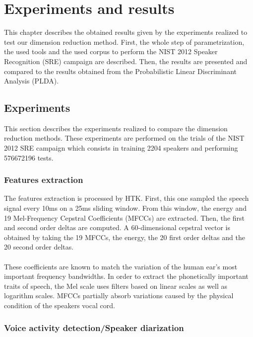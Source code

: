 \documentclass{techrep}
\begin{document}
\chapter{Experiments and results}

This chapter describes the obtained results given by the experiments
realized to test our dimension reduction method. First, the whole step
of parametrization, the used tools and the used corpus to perform
the NIST 2012 Speaker Recognition (SRE) campaign are described. Then, the results are
presented and compared to the results obtained from the Probabilistic
Linear Discriminant Analysis (PLDA).

\section{Experiments}


This section describes the experiments realized to compare the
dimension reduction methods. These experiments are performed on the
trials of the NIST 2012 SRE campaign which consists in training 2204
speakers and performing 576672196 tests. %

\subsection{Features extraction}

The features extraction is processed by HTK. First, this one sampled
the speech signal every 10ms on a 25ms sliding window. From this
window, the energy and 19 Mel-Frequency Cepstral Coefficients (MFCCs)
are extracted.  Then, the first and second order deltas are
computed. A 60-dimensional cepstral vector is obtained by taking the
19 MFCCs, the energy, the 20 first order deltas and the 20 second
order deltas.\\\\ These coefficients are known to match the variation
of the human ear's most important frequency bandwidths. In order to
extract the phonetically important traits of speech, the Mel scale
uses filters based on linear scales as well as logarithm scales. MFCCs
partially absorb variations caused by the physical condition of the
speakers vocal cord.

\subsection{Voice activity detection/Speaker diarization}
\end{document}
